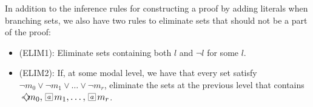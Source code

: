 In addition to the inference rules for constructing a proof by adding literals
when branching sets, we also have two rules to eliminate sets that should not be
a part of the proof: 
\begin{itemize}
    \item[] (ELIM1): Eliminate sets containing both $l$ and $\neg l$ for some $l$.
    \item[] (ELIM2): If, at some modal level, we have that every set satisfy
        $\neg m_0 \lor \neg m_1 \lor \ldots \lor \neg m_r$, eliminate the
        sets at the previous level that contains $\pos{a} m_0, \nec{a} m_1, \ldots, \nec{a}
        m_r$.
\end{itemize}

